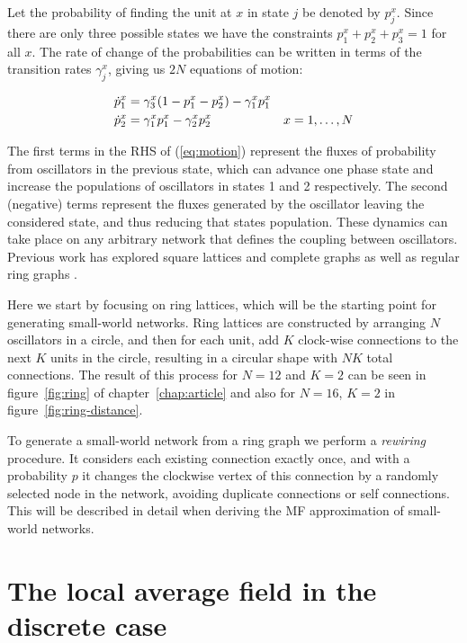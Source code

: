 Let the probability of finding the unit at $x$ in state $j$ be denoted by $p^x_j$. Since there are only three possible states we have
the constraints $p^x_1+p^x_2+p^x_3=1$ for all $x$. The rate of change of the probabilities can be written in terms of the transition
rates $\gamma^x_j$, giving us $2N$ equations of motion:

\begin{align}
    \dot{p}^x_1 &= \gamma^x_3(1 - p^x_1 - p^x_2) - \gamma^x_1 p^x_1 & \notag\\
    \dot{p}^x_2 &= \gamma^x_1p^x_1 - \gamma^x_2 p^x_2 &x=1,\dots,N
    \label{eq:motion}
\end{align}

\noindent The first terms in the RHS of (\ref{eq:motion}) represent the fluxes of probability from oscillators in the previous state,
which can advance one phase state and increase the populations of oscillators in states 1 and 2 respectively. The second (negative)
terms represent the fluxes generated by the oscillator leaving the considered state, and thus reducing that states population. These
dynamics can take place on any arbitrary network that defines the coupling between oscillators. Previous work has explored square
lattices and complete graphs as well as regular ring graphs \cite{Wood06a,assis2011infinite,escaff2014arrays}.

Here we start by focusing on ring lattices, which will be the starting point for generating small-world networks. Ring lattices are
constructed by arranging $N$ oscillators in a circle, and then for each unit, add $K$ clock-wise connections to the next $K$ units in
the circle, resulting in a circular shape with $NK$ total connections. The result of this process for $N=12$ and $K=2$ can be seen in
figure~\ref{fig:ring} of chapter~\ref{chap:article} and also for $N=16$, $K=2$ in figure~\ref{fig:ring-distance}.

To generate a small-world network from a ring graph we perform a \textit{rewiring} procedure. It considers each existing connection
exactly once, and with a probability $p$ it changes the clockwise vertex of this connection by a randomly selected node in the network,
avoiding duplicate connections or self connections. This will be described in detail when deriving the MF approximation of small-world
networks.

\section{The local average field in the discrete case}

